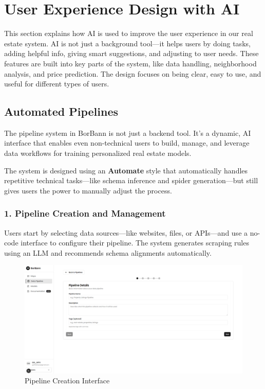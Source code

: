 \newpage

\section{User Experience Design with AI}

This section explains how AI is used to improve the user experience in our real estate system. AI is not just a background tool—it helps users by doing tasks, adding helpful info, giving smart suggestions, and adjusting to user needs. These features are built into key parts of the system, like data handling, neighborhood analysis, and price prediction. The design focuses on being clear, easy to use, and useful for different types of users.

\subsection{Automated Pipelines}

The pipeline system in BorBann is not just a backend tool. It’s a dynamic, AI interface that enables even non-technical users to build, manage, and leverage data workflows for training personalized real estate models.

The system is designed using an \textbf{Automate} style that automatically handles repetitive technical tasks—like schema inference and spider generation—but still gives users the power to manually adjust the process.

\subsubsection*{1. Pipeline Creation and Management}

Users start by selecting data sources—like websites, files, or APIs—and use a no-code interface to configure their pipeline. The system generates scraping rules using an LLM and recommends schema alignments automatically.

\begin{figure}[htbp]
	\centering
	\includegraphics[width=1\textwidth]{assets/ai/pipeline-1.png}
	\caption{Pipeline Creation Interface}
	\label{fig:pipeline-creation-ui}
\end{figure}

